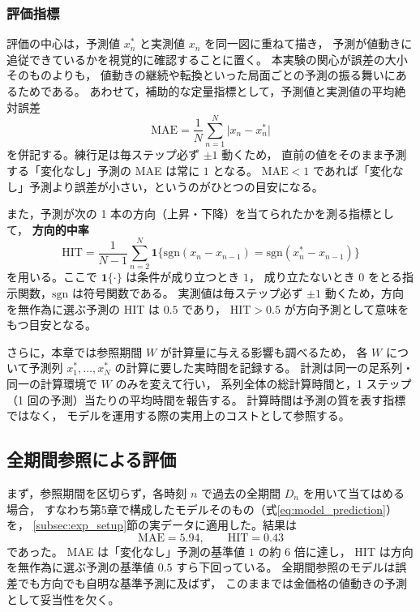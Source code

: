 \documentclass[a4j,dvipdfmx]{jsarticle}
\theoremstyle{plainnote}
\begin{document}
\subsubsection*{評価指標}

評価の中心は，予測値 $x_n^{\ast}$ と実測値 $x_n$ を同一図に重ねて描き，
予測が値動きに追従できているかを視覚的に確認することに置く。
本実験の関心が誤差の大小そのものよりも，
値動きの継続や転換といった局面ごとの予測の振る舞いにあるためである。
あわせて，補助的な定量指標として，予測値と実測値の平均絶対誤差
\begin{equation}
  \mathrm{MAE}=\frac{1}{N}\sum_{n=1}^{N}\lvert x_n-x_n^{\ast}\rvert
  \label{eq:mae}
\end{equation}
を併記する。練行足は毎ステップ必ず $\pm1$ 動くため，
直前の値をそのまま予測する「変化なし」予測の MAE は常に $1$ となる。
$\mathrm{MAE}<1$ であれば「変化なし」予測より誤差が小さい，というのがひとつの目安になる。

また，予測が次の 1 本の方向（上昇・下降）を当てられたかを測る指標として，
\textbf{方向的中率}
\begin{equation}
  \mathrm{HIT}
  =
  \frac{1}{N-1}
  \sum_{n=2}^{N}
  \mathbf{1}\bigl\{
    \mathrm{sgn}(x_n-x_{n-1})
    =
    \mathrm{sgn}(x_n^{\ast}-x_{n-1})
  \bigr\}
  \label{eq:hit}
\end{equation}
を用いる。ここで $\mathbf{1}\{\cdot\}$ は条件が成り立つとき $1$，
成り立たないとき $0$ をとる指示関数，$\mathrm{sgn}$ は符号関数である。
実測値は毎ステップ必ず $\pm1$ 動くため，方向を無作為に選ぶ予測の HIT は $0.5$ であり，
$\mathrm{HIT}>0.5$ が方向予測として意味をもつ目安となる。

さらに，本章では参照期間 $W$ が計算量に与える影響も調べるため，
各 $W$ について予測列 $x_1^{\ast},\ldots,x_N^{\ast}$ の計算に要した実時間を記録する。
計測は同一の足系列・同一の計算環境で $W$ のみを変えて行い，
系列全体の総計算時間と，1 ステップ（1 回の予測）当たりの平均時間を報告する。
計算時間は予測の質を表す指標ではなく，
モデルを運用する際の実用上のコストとして参照する。

\subsection{全期間参照による評価}\label{subsec:full_baseline}

まず，参照期間を区切らず，各時刻 $n$ で過去の全期間 $D_n$ を用いて当てはめる場合，
すなわち第5章で構成したモデルそのもの（式\eqref{eq:model_prediction}）を，
\ref{subsec:exp_setup}節の実データに適用した。結果は
\[
  \mathrm{MAE}=5.94,
  \qquad
  \mathrm{HIT}=0.43
\]
であった。
MAE は「変化なし」予測の基準値 $1$ の約 $6$ 倍に達し，
HIT は方向を無作為に選ぶ予測の基準値 $0.5$ すら下回っている。
全期間参照のモデルは誤差でも方向でも自明な基準予測に及ばず，
このままでは金価格の値動きの予測として妥当性を欠く。
\end{document}
